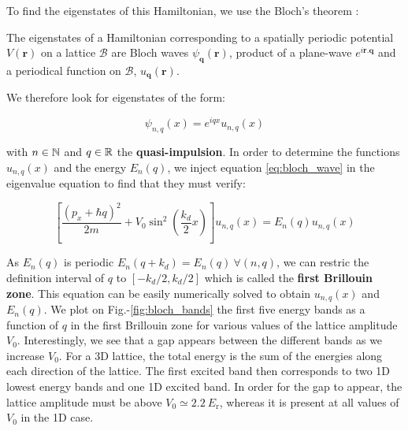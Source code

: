 \noindent To find the eigenstates of this Hamiltonian, we use the Bloch's theorem \cite{ashcroft1976solid}:

\begin{tcolorbox}[colback=red!5!white,colframe=red!75!black,title=\textbf{Bloch's theorem}]
\label{sec:bloch}
The eigenstates of a Hamiltonian corresponding to a spatially periodic potential $V(\bm{r})$ on a lattice $\mathcal{B}$ are Bloch waves $\psi_{\bm{q}}(\bm{r})$, product of a plane-wave $e^{i \bm{r}.\bm{q}}$ and a periodical function on $\mathcal{B}$, $u_{\bm{q}} (\bm{r})$.
\end{tcolorbox}

We therefore look for eigenstates of the form:

\begin{equation}
    \psi_{n,q} (x)= e^{iqx} u_{n,q} (x)
    \label{eq:bloch_wave}
\end{equation}

\noindent with $n \in \mathbb{N}$ and $q \in \mathbb{R}$ the \textbf{quasi-impulsion}. In order to determine the functions $u_{n,q} (x)$ and the energy $E_n (q)$, we inject equation \ref{eq:bloch_wave} in the eigenvalue equation to find that they must verify:

\begin{equation}
    \left[\frac{\left(p_{x}+\hbar q\right)^{2}}{2 m}+V_{0} \sin ^{2}\left(\frac{k_{d}}{2} x\right)\right] u_{n, q}(x)=E_{n}(q) u_{n, q}(x)
\end{equation}

\noindent As $E_n (q)$ is periodic $E_n (q+k_d)= E_n(q) \ \forall (n,q)$, we can restric the definition interval of $q$ to $[-k_d/2, k_d/2]$ which is called the \textbf{first Brillouin zone}. This equation can be easily numerically solved to obtain $u_{n, q}(x)$ and $E_n (q)$. We plot on Fig.-\ref{fig:bloch_bands} the first five energy bands as a function of $q$ in the first Brillouin zone for various values of the lattice amplitude $V_0$. Interestingly, we see that a gap appears between the different bands as we increase $V_0$. For a 3D lattice, the total energy is the sum of the energies along each direction of the lattice. The first excited band then corresponds to two 1D lowest energy bands and one 1D excited band. In order for the gap to appear, the lattice amplitude must be above $V_0 \simeq 2.2 \ E_{\mathrm{r}}$, whereas it is present at all values of $V_0$ in the 1D case.

